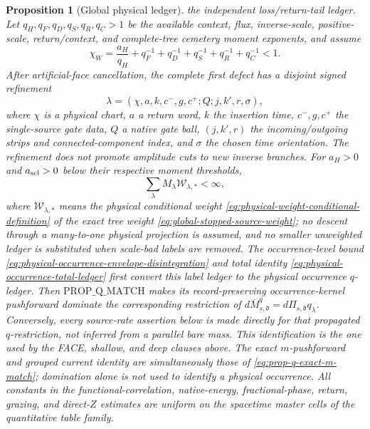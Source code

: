 \documentclass[11pt]{article}
\newtheorem{proposition}[theorem]{Proposition}
\begin{document}
\begin{proposition}[Global physical ledger]
the independent loss/return-tail ledger.  Let
$q_H,q_F,q_D,q_S,q_R,q_C>1$ be the available context, flux, inverse-scale,
positive-scale, return/context, and complete-tree cemetery moment exponents,
and assume
\begin{equation}
\label{eq:holder-conjugate-margin}
 \chi_W=\frac{a_H}{q_H}+q_F^{-1}+q_D^{-1}+q_S^{-1}+q_R^{-1}
        +q_C^{-1}<1.
\end{equation}
After artificial-face cancellation, the complete first defect has a disjoint
signed refinement
\begin{equation}
\label{eq:global-label}
 \lambda=(\chi,a,k,c^-,g,c^+;Q;j,k',r,\sigma),
\end{equation}
where $\chi$ is a physical chart, $a$ a return word, $k$ the insertion time,
$c^-,g,c^+$ the single-source gate data, $Q$ a native gate ball,
$(j,k',r)$ the incoming/outgoing strips and connected-component index, and
$\sigma$ the chosen time orientation.  The refinement does not promote
amplitude cuts to new inverse branches.  For $a_H>0$ and $a_{\rm scl}>0$
below their respective moment thresholds,
\begin{equation}
\label{eq:global-ledger-sum}
\sum_\lambda M_\lambda\mathscr W_{\lambda,*}<\infty,
\end{equation}
where $\mathscr W_{\lambda,*}$ means the physical conditional weight
\eqref{eq:physical-weight-conditional-definition} of the exact tree weight
\eqref{eq:global-stopped-source-weight}; no descent through a many-to-one
physical projection is assumed, and no smaller unweighted ledger is
substituted when scale-bad labels are removed.  The occurrence-level bound
\eqref{eq:physical-occurrence-envelope-disintegration} and total identity
\eqref{eq:physical-occurrence-total-ledger} first convert this label ledger
to the physical occurrence $q$-ledger.  Then $\mathrm{PROP\_Q\_MATCH}$ makes
its record-preserving occurrence-kernel pushforward dominate the
corresponding restriction of
$d\overline M_{s,\mathfrak d}^{q}
=d\Pi_{s,\mathfrak d}q_\lambda$.  Conversely, every
source-rate assertion below is made directly for that propagated
$q$-restriction, not inferred from a parallel bare mass.  This identification
is the one used by the FACE, shallow, and deep clauses above.  The exact
$m$-pushforward and grouped current identity are simultaneously those of
\eqref{eq:prop-q-exact-m-match}; domination alone is not used to identify a
physical occurrence.
All constants in the functional-correlation, native-energy,
fractional-phase, return, grazing, and direct-$Z$ estimates are uniform on
the spacetime master cells of the quantitative table family.
\end{proposition}
\end{document}

